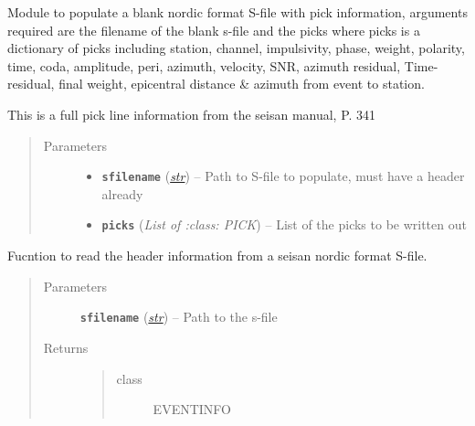 \documentclass[a4paper,10pt,english]{sphinxmanual}
\begin{document}

\begin{fulllineitems}
\label{utils:Sfile_util.populateSfile}
Module to populate a blank nordic format S-file with pick information,
arguments required are the filename of the blank s-file and the picks
where picks is a dictionary of picks including station, channel,
impulsivity, phase, weight, polarity, time, coda, amplitude, peri, azimuth,
velocity, SNR, azimuth residual, Time-residual, final weight,
epicentral distance \& azimuth from event to station.

This is a full pick line information from the seisan manual, P. 341
\begin{quote}\begin{description}
\item[{Parameters}] \leavevmode\begin{itemize}
\item {} 
\textbf{\texttt{sfilename}} (\href{https://docs.python.org/library/functions.html\#str}{\emph{str}}) -- Path to S-file to populate, must have a header already

\item {} 
\textbf{\texttt{picks}} (\emph{List of :class: PICK}) -- List of the picks to be written out

\end{itemize}

\end{description}\end{quote}

\end{fulllineitems}


\begin{fulllineitems}
\label{utils:Sfile_util.readheader}
Fucntion to read the header information from a seisan nordic format S-file.
\begin{quote}\begin{description}
\item[{Parameters}] \leavevmode
\textbf{\texttt{sfilename}} (\href{https://docs.python.org/library/functions.html\#str}{\emph{str}}) -- Path to the s-file

\item[{Returns}] \leavevmode
\begin{quote}\begin{description}
\item[{class}] \leavevmode
EVENTINFO

\end{description}\end{quote}


\end{description}\end{quote}

\end{fulllineitems}
\end{document}
